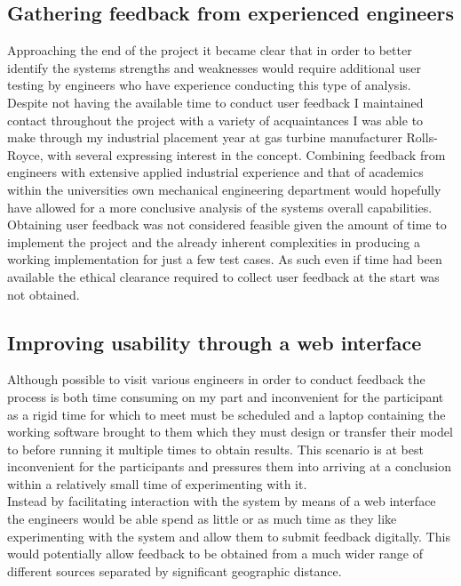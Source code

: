 \documentclass{article}
\begin{document}
\subsection{Gathering feedback from experienced engineers}
Approaching the end of the project it became clear that in order to better identify the systems strengths and weaknesses would require additional user testing by engineers who have experience conducting this type of analysis. Despite not having the available time to conduct user feedback I maintained contact throughout the project with a variety of acquaintances I was able to make through my industrial placement year at gas turbine manufacturer Rolls-Royce, with several expressing interest in the concept. Combining feedback from engineers with extensive applied industrial experience and that of academics within the universities own mechanical engineering department would hopefully have allowed for a more conclusive analysis of the systems overall capabilities. Obtaining user feedback was not considered feasible given the amount of time to implement the project and the already inherent complexities in producing a working implementation for just a few test cases. As such even if time had been available the ethical clearance required to collect user feedback at the start was not obtained.


\subsection{Improving usability through a web interface}
Although possible to visit various engineers in order to conduct feedback the process is both time consuming on my part and inconvenient for the participant as a rigid time for which to meet must be scheduled and a laptop containing the working software brought to them which they must design or transfer their model to before running it multiple times to obtain results. This scenario is at best inconvenient for the participants and pressures them into arriving at a conclusion within a relatively small time of experimenting with it. \\ 

\noindent
Instead by facilitating interaction with the system by means of a web interface the engineers would be able spend as little or as much time as they like experimenting with the system and allow them to submit feedback digitally. This would potentially allow feedback to be obtained from  a much wider range of different sources separated by significant geographic distance. \\\ 
\end{document}
